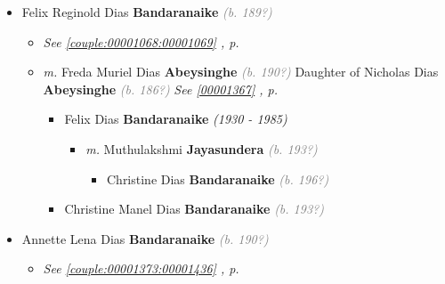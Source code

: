 \documentclass[10pt, openany]{book}
\begin{document}
\begin{itemize}
{\begin{itemize}
{\begin{itemize}
{\begin{itemize}
{\begin{itemize}
{\begin{itemize}
{\begin{itemize}
{\begin{itemize}
{  }
\end{itemize}}
\end{itemize}
  }
\end{itemize}}
\end{itemize}
   }
\end{itemize}}
\end{itemize}
    }
\item{Felix Reginold Dias \textbf{Bandaranaike} \textcolor{gray}{\textit{(b. 189?)}}
\begin{itemize}
\item{\textcolor{slteal}{\textit{See  \autoref{couple:00001068:00001069} \textit{, p. \pageref{couple:00001068:00001069} }}}}
\item{\textit{m.} Freda Muriel Dias \textbf{Abeysinghe} \textcolor{gray}{\textit{(b. 190?)}} Daughter of  Nicholas Dias \textbf{Abeysinghe} \textcolor{gray}{\textit{(b. 186?)}} \textcolor{slteal}{\textit{See  \autoref{00001367} \textit{, p. \pageref{00001367} }}}   \label{couple:00001069:00001366} \begin{itemize}
\item{Felix Dias \textbf{Bandaranaike} \textcolor{slorange}{\textit{(1930 - 1985)}}
\begin{itemize}
\item{\textit{m.} Muthulakshmi \textbf{Jayasundera} \textcolor{gray}{\textit{(b. 193?)}}   \label{couple:00002174:00002175} \begin{itemize}
\item{Christine Dias \textbf{Bandaranaike} \textcolor{gray}{\textit{(b. 196?)}}
  }
\end{itemize}}
\end{itemize}
  }
\item{Christine Manel Dias \textbf{Bandaranaike} \textcolor{gray}{\textit{(b. 193?)}}
   }
\end{itemize}}
\end{itemize}
   }
\item{Annette Lena Dias \textbf{Bandaranaike} \textcolor{gray}{\textit{(b. 190?)}}
\begin{itemize}
\item{\textcolor{slteal}{\textit{See  \autoref{couple:00001373:00001436} \textit{, p. \pageref{couple:00001373:00001436} }}}}
\end{itemize}
   }
\end{itemize}}
\end{itemize}
   
\end{document}
